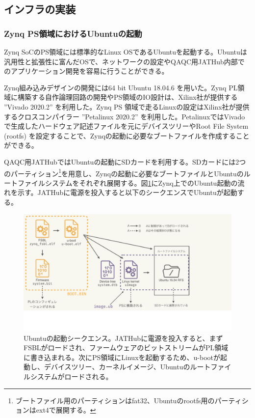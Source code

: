 \subsection{インフラの実装}
\label{subsec_infra}

\subsubsection{Zynq PS領域におけるUbuntuの起動}
\baselineskip
\label{subsubsec_ubuntu}
Zynq SoCのPS領域には標準的なLinux OSであるUbuntuを起動する。Ubuntuは汎用性と拡張性に富んだOSで、ネットワークの設定やQAQC用JATHub内部でのアプリケーション開発を容易に行うことができる。

Zynq組み込みデザインの開発には64 bit Ubuntu 18.04.6 を用いた。Zynq PL領域に構築する自作論理回路の開発やPS領域のIO設計は、Xilinx社が提供する ”Vivado 2020.2” を利用した。Zynq PS 領域で走るLinuxの設定はXilinx社が提供するクロスコンパイラー ”Petalinux 2020.2” を利用した。PetalinuxではVivadoで生成したハードウェア記述ファイルを元にデバイスツリーやRoot File System (rootfs) を設定することで、Zynqの起動に必要なブートファイルを作成することができる。

QAQC用JATHubではUbuntuの起動にSDカードを利用する。SDカードには2つのパーティション\footnote{ブートファイル用のパーティションはfat32、Ubuntuのrootfs用のパーティションはext4で展開する。}を用意し、Zynqの起動に必要なブートファイルとUbuntuのルートファイルシステムをそれぞれ展開する。図\ref{JATHubboot}にZynq上でのUbuntu起動の流れを示す。JATHubに電源を投入すると以下のシークエンスでUbuntuが起動する。

\begin{figure} 
\centering
\includegraphics[width=12cm]{fig/QAQC/JATHubboot.pdf}
\caption[Ubuntuの起動シークエンス]{Ubuntuの起動シークエンス\cite{mt_okazaki}。JATHubに電源を投入すると、まずFSBLがロードされ、ファームウェアのビットストリームがPL領域に書き込まれる。次にPS領域にLinuxを起動するため、u-bootが起動し、デバイスツリー、カーネルイメージ、Ubuntuのルートファイルシステムがロードされる。}
\label{JATHubboot}
\end{figure}

